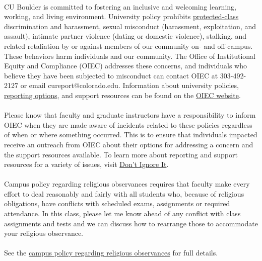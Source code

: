 \documentclass[11pt]{article}
\begin{document}
\\
CU Boulder is committed to fostering an inclusive and welcoming learning, working, and living environment. University policy prohibits \href{https://www.colorado.edu/oiec/policies/discrimination-harassment-policy/protected-class-definitions}{protected-class} discrimination and harassment, sexual misconduct (harassment, exploitation, and assault), intimate partner violence (dating or domestic violence), stalking, and related retaliation by or against members of our community on- and off-campus. These behaviors harm individuals and our community. The Office of Institutional Equity and Compliance (OIEC) addresses these concerns, and individuals who believe they have been subjected to misconduct can contact OIEC at 303-492-2127 or email cureport@colorado.edu. Information about university policies, \href{https://www.colorado.edu/oiec/reporting-resolutions/making-report}{reporting options}, and support resources can be found on the \href{https://www.colorado.edu/oiec/}{OIEC website}.\\
\\
Please know that faculty and graduate instructors have a responsibility to inform OIEC when they are made aware of incidents related to these policies regardless of when or where something occurred. This is to ensure that individuals impacted receive an outreach from OIEC about their options for addressing a concern and the support resources available. To learn more about reporting and support resources for a variety of issues, visit \href{https://www.colorado.edu/dontignoreit/}{Don’t Ignore It}.\\

\\
Campus policy regarding religious observances requires that faculty make every effort to deal reasonably and fairly with all students who, because of religious obligations, have conflicts with scheduled exams, assignments or required attendance. In this class, please let me know ahead of any conflict with class assignments and tests and we can discuss how to rearrange those to accommodate your religious observance.\\
\\
See the \href{https://www.colorado.edu/policies/observance-religious-holidays-absences-classes-or-exams}{campus policy regarding religious observances} for full details.\\
\end{document}
